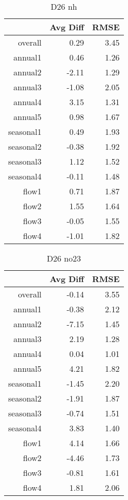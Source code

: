 \begin{table}[H]
\centering
\begin{tabular}{rrr}
  \hline
 & Avg Diff & RMSE \\ 
  \hline
overall & 0.29 & 3.45 \\ 
  annual1 & 0.46 & 1.26 \\ 
  annual2 & -2.11 & 1.29 \\ 
  annual3 & -1.08 & 2.05 \\ 
  annual4 & 3.15 & 1.31 \\ 
  annual5 & 0.98 & 1.67 \\ 
  seasonal1 & 0.49 & 1.93 \\ 
  seasonal2 & -0.38 & 1.92 \\ 
  seasonal3 & 1.12 & 1.52 \\ 
  seasonal4 & -0.11 & 1.48 \\ 
  flow1 & 0.71 & 1.87 \\ 
  flow2 & 1.55 & 1.64 \\ 
  flow3 & -0.05 & 1.55 \\ 
  flow4 & -1.01 & 1.82 \\ 
   \hline
\end{tabular}
\caption{D26 nh} 
\end{table}
\begin{table}[H]
\centering
\begin{tabular}{rrr}
  \hline
 & Avg Diff & RMSE \\ 
  \hline
overall & -0.14 & 3.55 \\ 
  annual1 & -0.38 & 2.12 \\ 
  annual2 & -7.15 & 1.45 \\ 
  annual3 & 2.19 & 1.28 \\ 
  annual4 & 0.04 & 1.01 \\ 
  annual5 & 4.21 & 1.82 \\ 
  seasonal1 & -1.45 & 2.20 \\ 
  seasonal2 & -1.91 & 1.87 \\ 
  seasonal3 & -0.74 & 1.51 \\ 
  seasonal4 & 3.83 & 1.40 \\ 
  flow1 & 4.14 & 1.66 \\ 
  flow2 & -4.46 & 1.73 \\ 
  flow3 & -0.81 & 1.61 \\ 
  flow4 & 1.81 & 2.06 \\ 
   \hline
\end{tabular}
\caption{D26 no23} 
\end{table}
